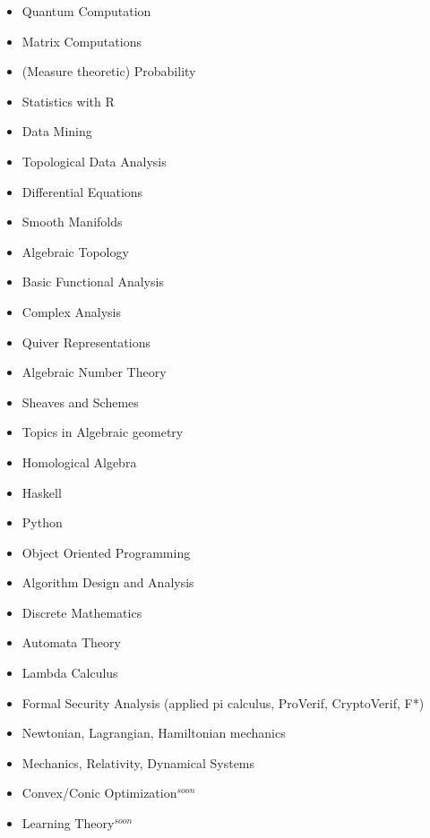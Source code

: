 \begin{multicols}{3}
\begin{itemize}
\setlength\itemsep{-0.5em}
\item Quantum Computation
\item Matrix Computations
\item (Measure theoretic) Probability
\item Statistics with R
\item Data Mining
\item Topological Data Analysis
\item Differential Equations
\item Smooth Manifolds
\item Algebraic Topology
\item Basic Functional Analysis
\item Complex Analysis
\item Quiver Representations
\item Algebraic Number Theory
\item Sheaves and Schemes
\item Topics in Algebraic geometry
\item Homological Algebra
\item Haskell
\item Python
\item Object Oriented Programming
\item Algorithm Design and Analysis
\item Discrete Mathematics
\item Automata Theory
\item Lambda Calculus
\item Formal Security Analysis (applied pi calculus, ProVerif, CryptoVerif, F*)
\item Newtonian, Lagrangian, Hamiltonian mechanics
\item Mechanics, Relativity, Dynamical Systems
\item Convex/Conic Optimization$^{soon}$
\item Learning Theory$^{soon}$
\end{itemize}
\end{multicols}





